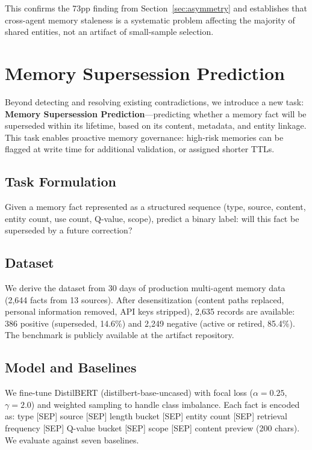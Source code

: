 \documentclass[11pt]{article}
\begin{document}
This confirms the 73pp finding from Section~\ref{sec:asymmetry} and establishes that cross-agent memory staleness is a systematic problem affecting the majority of shared entities, not an artifact of small-sample selection.


\section{Memory Supersession Prediction}
\label{sec:supersession_pred}

Beyond detecting and resolving existing contradictions, we introduce a new task: \textbf{Memory Supersession Prediction}---predicting whether a memory fact will be superseded within its lifetime, based on its content, metadata, and entity linkage. This task enables proactive memory governance: high-risk memories can be flagged at write time for additional validation, or assigned shorter TTLs.

\subsection{Task Formulation}

Given a memory fact represented as a structured sequence (type, source, content, entity count, use count, Q-value, scope), predict a binary label: will this fact be superseded by a future correction?

\subsection{Dataset}

We derive the dataset from 30 days of production multi-agent memory data (2{,}644 facts from 13 sources). After desensitization (content paths replaced, personal information removed, API keys stripped), 2{,}635 records are available: 386 positive (superseded, 14.6\%) and 2{,}249 negative (active or retired, 85.4\%). The benchmark is publicly available at the artifact repository.

\subsection{Model and Baselines}

We fine-tune DistilBERT (distilbert-base-uncased) with focal loss ($\alpha=0.25$, $\gamma=2.0$) and weighted sampling to handle class imbalance. Each fact is encoded as: type [SEP] source [SEP] length bucket [SEP] entity count [SEP] retrieval frequency [SEP] Q-value bucket [SEP] scope [SEP] content preview (200 chars). We evaluate against seven baselines.
\end{document}
